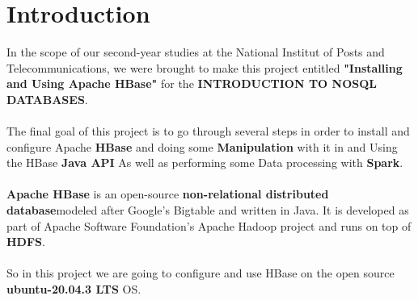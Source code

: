 \chapter*{Introduction}
\begin{spacing}{1.5}
\Large In the scope of our second-year studies at the National Institut of Posts and Telecommunications, we were brought to make this project entitled \textbf{"Installing and Using Apache HBase"} for the \textbf{INTRODUCTION TO NOSQL DATABASES}.
\\\\
The final goal of this project is to go through several steps in order to install and configure Apache \textbf{HBase} and doing some \textbf{Manipulation} with it in and Using the HBase \textbf{Java API} As well as performing some Data processing with \textbf{Spark}.
\\\\
\textbf{Apache HBase} is an open-source \textbf{non-relational distributed database}modeled after Google's Bigtable and written in Java. It is developed as part of Apache Software Foundation's Apache Hadoop project and runs on top of \textbf{HDFS}.
\\\\
So in this project we are going to configure and use HBase on the open source \textbf{ubuntu-20.04.3 LTS} OS. \\ 


\end{spacing}

\makeatletter
\renewcommand{\thesection}{\@arabic\c@section}
\makeatother
